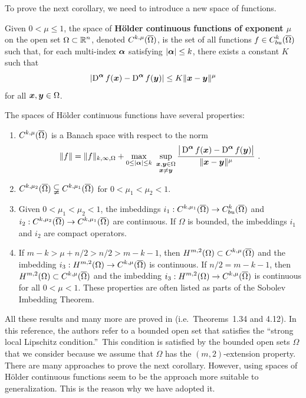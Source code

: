To prove the next corollary, we need to introduce a new space of
functions.

\begin{defn} \label{defnHolderContFunct}
Given $0 < \mu \leq 1$, the space of {\bfseries Hölder continuous
functions of exponent $\mu$} on the open set $\displaystyle \Omega \subset \mathbb{R}^n$,
denoted $\displaystyle C^{k,\mu}(\overline{\Omega})$, is
the set of all functions $\displaystyle f \in C_{bu}^k(\overline{\Omega})$
such that, for each multi-index ${\bm{\alpha}}$ satisfying
$|{\bm{\alpha}}|\leq k$, there exists a constant $K$ such that
\[
  \left| \operatorname{D}^{{\bm{\alpha}}} f({\bm{x}}) - \operatorname{D}^{{\bm{\alpha}}} f({\bm{y}}) \right|
  \leq K \|{\bm{x}} - {\bm{y}} \|^{\mu}
\]
for all ${\bm{x}}, {\bm{y}} \in \Omega$.
\end{defn}

The spaces of Hölder continuous functions have several properties:
\begin{enumerate}
\item $\displaystyle C^{k,\mu}(\overline{\Omega})$ is a Banach space
with respect to the norm
\[
\|f\| = \|f\|_{k,\infty,\Omega} + \max_{0\leq |{\bm{\alpha}}|\leq k}
\ \sup_{\substack{{\bm{x}},{\bm{y}} \in \Omega\\ {\bm{x}} \neq {\bm{y}}}}
\frac{\big|\operatorname{D}^{{\bm{\alpha}}} f({\bm{x}}) - \operatorname{D}^{{\bm{\alpha}}} f({\bm{y}})\big|}
{\|{\bm{x}}-{\bm{y}}\|^{\mu}} \ .
\]
\item $\displaystyle C^{k,\mu_2}(\overline{\Omega})
\subsetneqq C^{k,\mu_1}(\overline{\Omega})$ for $0 < \mu_1 < \mu_2 < 1$.
\item Given $0 < \mu_1 < \mu_2 < 1$, the imbeddings
$\displaystyle i_1 : C^{k,\mu_1}(\overline{\Omega})
\to C_{bu}^k(\overline{\Omega})$
and
$\displaystyle i_2 : C^{k,\mu_2}(\overline{\Omega})
\to C^{k,\mu_1}(\overline{\Omega})$
are continuous.  If $\Omega$ is bounded, the imbeddings $i_1$ and
$i_2$ are compact operators.
\item If $m-k > \mu + n/2 > n/2 > m-k-1$, then
$\displaystyle H^{m,2}(\Omega) \subset C^{k,\mu}(\overline{\Omega})$
and the imbedding
$\displaystyle i_3: H^{m,2}(\Omega) \to C^{k,\mu}(\overline{\Omega})$
is continuous.  If $n/2 = m-k-1$, then
$\displaystyle H^{m,2}(\Omega) \subset C^{k,\mu}(\overline{\Omega})$
and the imbedding
$\displaystyle i_3: H^{m,2}(\Omega) \to C^{k,\mu}(\overline{\Omega})$
is continuous for all $0<\mu<1$.  These properties are often listed
as parts of the Sobolev Imbedding Theorem.
\end{enumerate}
All these results and many more are proved in \cite{Ad} (i.e.\ Theorems~1.34
and 4.12).  In this reference, the authors refer to a bounded open set
that satisfies the ``strong local Lipschitz condition.''\ This
condition is satisfied
by the bounded open sets $\Omega$ that we consider because we assume
that $\Omega$ has the $(m,2)$-extension property.
There are many approaches to prove the next corollary.  However, using spaces of
Hölder continuous functions seem to be the approach more suitable to
generalization.  This is the reason why we have adopted it.

